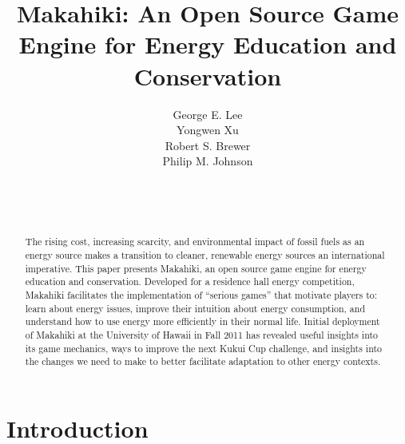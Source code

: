 \documentclass{acm_proc_article-sp}
\begin{document}
\title{Makahiki: An Open Source Game Engine for Energy Education and Conservation}


\author{
\smallskip
George E. Lee\\ 
\smallskip
Yongwen Xu\\ 
\smallskip
Robert S. Brewer\\ 
\smallskip
Philip M. Johnson\\
       \\
       \\
       \\
}

\maketitle
\begin{abstract}
  The rising cost, increasing scarcity, and environmental impact of fossil
  fuels as an energy source makes a transition to cleaner, renewable energy
  sources an international imperative.  This paper presents Makahiki, an open
  source game engine for energy education and conservation. Developed for a
  residence hall energy competition, Makahiki facilitates the implementation of
  ``serious games'' that motivate players to: learn about energy issues,
  improve their intuition about energy consumption, and understand how to use energy more
  efficiently in their normal life.  Initial deployment of Makahiki at the
  University of Hawaii in Fall 2011 has revealed useful insights into its game
  mechanics, ways to improve the next Kukui Cup challenge, and insights
  into the changes we need to make to better facilitate adaptation to other energy contexts.
\end{abstract}




\section{Introduction}
\end{document}

